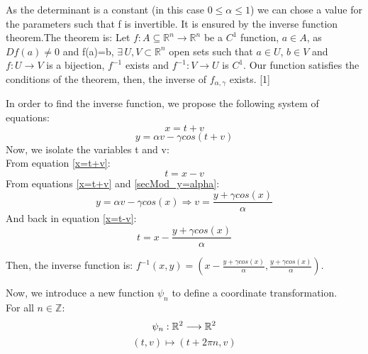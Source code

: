 \documentclass[a4paper]{article}
\begin{document}
As the determinant is a constant (in this case $0 \leq \alpha \leq 1$) we can chose a value for the parameters such that f is invertible. It is ensured by the inverse function theorem.The theorem is: Let $f:A\subseteq \mathbb{R}^n \rightarrow \mathbb{R}^n$ be a $C^1$ function, $a\in A$, as $Df(a)\neq 0$ and f(a)=b, $\exists \, U,V \subset \mathbb{R}^n$ open sets such that $a\in U$, $b\in V$ and $f:U\rightarrow V$ is a bijection, $f^{-1}$ exists and $f^{-1}:V\rightarrow U$ is $C^1$. Our function satisfies the conditions of the theorem, then, the inverse of $f_{\alpha,\gamma}$ exists. [1]




\newpage



In order to find the inverse function, we propose the following system of equations:
\begin{equation}\label{x=t+v}
x=t+v
\end{equation}
\begin{equation}\label{secMod_y=alpha}
y=\alpha v - \gamma cos(t+v)
\end{equation}
Now, we isolate the variables t and v:\\
From equation \ref{x=t+v}:
\begin{equation}\label{x=t-v}
t=x-v
\end{equation}
From equations \ref{x=t+v} and \ref{secMod_y=alpha}:
\begin{equation}
y=\alpha v - \gamma cos(x) \Rightarrow v=\frac{y+\gamma cos(x)}{\alpha}
\end{equation}
And back in equation \ref{x=t-v}:
\begin{equation}
t=x-\frac{y+\gamma cos(x)}{\alpha}
\end{equation}

Then, the inverse function is:
$f^{-1}(x,y)=(x-\frac{y+\gamma cos(x)}{\alpha},\frac{y+\gamma cos(x)}{\alpha})$.

Now, we introduce a new function $\psi_n$ to define a coordinate transformation.\\
For all $n\in \mathbb{Z}$:
$$
\psi_n:\mathbb{R}^2\longrightarrow \mathbb{R}^2\\
$$
\begin{equation}
(t,v)\mapsto (t+2\pi n,v)
\end{equation}
\end{document}
